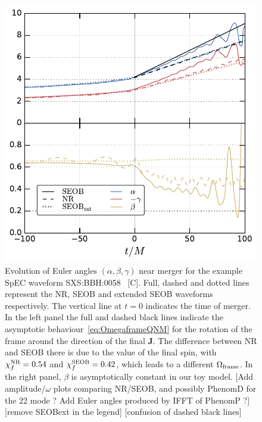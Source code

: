 \documentclass[aps,showpacs,twocolumn,
prd,superscriptaddress,nofootinbib]{revtex4-1}
\newcommand{\SM}[1]{{\color{Red} #1}}
\begin{document}
\begin{figure}
  \centering
  \includegraphics[width=.98\linewidth]{plots/eulerSXS0058_py.pdf}
  \caption{Evolution of Euler angles $(\alpha, \beta, \gamma)$ near merger for the example SpEC waveform SXS:BBH:0058~\cite{SpEC, SXScatalog, Mroue+12, Mroue+13} \SM{[C]}. Full, dashed and dotted lines represent the NR, SEOB and extended SEOB waveforms respectively. The vertical line at $t=0$ indicates the time of merger. In the left panel the full and dashed black lines indicate the asymptotic behaviour~\eqref{eq:OmegaframeQNM} for the rotation of the frame around the direction of the final $\bm{J}$. The difference between NR and SEOB there is due to the value of the final spin, with $\chi_{f}^{\rm NR} = 0.54$ and $\chi_{f}^{\rm SEOB} = 0.42$, which leads to a different $\Omega_{\rm frame}$. In the right panel, $\beta$ is asymptotically constant in our toy model. \SM{[Add amplitude/$\omega$ plots comparing NR/SEOB, and possibly PhenomD for the 22 mode ? Add Euler angles produced by IFFT of PhenomP ?]} \SM{[remove SEOBext in the legend]} \SM{[confusion of dashed black lines]}}
  \label{fig:precmodel}
\end{figure}
\end{document}

